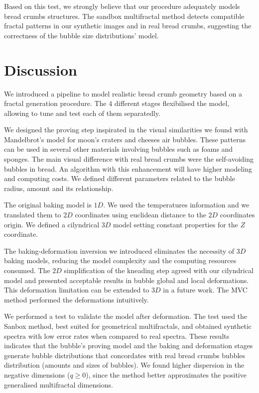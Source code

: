 \documentclass[final,5p,times]{elsarticle}
\begin{document}
{%

Based on this test, we strongly believe that our procedure adequately models bread crumbs structures. The sandbox multifractal method %
detects compatible fractal patterns in our synthetic images and in real bread crumbs, suggesting the correctness of the bubble size distributions' model.


\section{Discussion}
We introduced a pipeline to model realistic bread crumb geometry based on a fractal generation procedure. The $4$ different stages flexibilised the model, allowing to tune and test each of them separatedly.

We designed the proving step inspirated in the visual similarities we found with Mandelbrot's model for moon's craters and cheeses air bubbles. These patterns can be used in several other materials involving bubbles such as foams and sponges. The main visual difference with real bread crumbs were the self-avoiding bubbles in bread. An algorithm with this enhancement will have higher modeling and computing costs. We defined different parameters related to the bubble radius, amount and its relationship.

The original baking model is $1D$. We used the temperatures information  and we translated them to $2D$ coordinates using euclidean distance to the $2D$ coordinates origin. We defined a cilyndrical $3D$ model setting constant properties for the $Z$ coordinate. 

The baking-deformation inversion we introduced eliminates the necessity of $3D$ baking models, reducing the model complexity and the computing resources consumed. The $2D$ simplification of the kneading step agreed with our cilyndrical model and presented acceptable results in bubble global and local deformations. This  deformation limitation can be extended to $3D$ in a future work. The MVC method performed the deformations intuitively.

We performed a test to validate the model after deformation. The test used the Sanbox method, best suited for geometrical multifractals, and obtained synthetic spectra with low error rates when compared to real spectra.  These results indicates that the bubble's proving model and the baking and deformation stages generate bubble distributions that concordates with real bread crumbs bubbles distribution (amounts and sizes of bubbles). 
We found higher dispersion in the negative dimensions ($q \ge 0$), since the method better approximates the positive generalised multifractal dimensions. 

}
\end{document}
